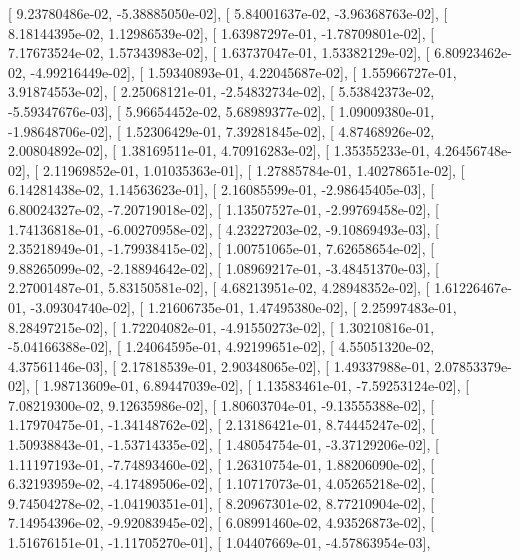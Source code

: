 \documentclass{article}
\begin{document}
       [  9.23780486e-02,  -5.38885050e-02],
       [  5.84001637e-02,  -3.96368763e-02],
       [  8.18144395e-02,   1.12986539e-02],
       [  1.63987297e-01,  -1.78709801e-02],
       [  7.17673524e-02,   1.57343983e-02],
       [  1.63737047e-01,   1.53382129e-02],
       [  6.80923462e-02,  -4.99216449e-02],
       [  1.59340893e-01,   4.22045687e-02],
       [  1.55966727e-01,   3.91874553e-02],
       [  2.25068121e-01,  -2.54832734e-02],
       [  5.53842373e-02,  -5.59347676e-03],
       [  5.96654452e-02,   5.68989377e-02],
       [  1.09009380e-01,  -1.98648706e-02],
       [  1.52306429e-01,   7.39281845e-02],
       [  4.87468926e-02,   2.00804892e-02],
       [  1.38169511e-01,   4.70916283e-02],
       [  1.35355233e-01,   4.26456748e-02],
       [  2.11969852e-01,   1.01035363e-01],
       [  1.27885784e-01,   1.40278651e-02],
       [  6.14281438e-02,   1.14563623e-01],
       [  2.16085599e-01,  -2.98645405e-03],
       [  6.80024327e-02,  -7.20719018e-02],
       [  1.13507527e-01,  -2.99769458e-02],
       [  1.74136818e-01,  -6.00270958e-02],
       [  4.23227203e-02,  -9.10869493e-03],
       [  2.35218949e-01,  -1.79938415e-02],
       [  1.00751065e-01,   7.62658654e-02],
       [  9.88265099e-02,  -2.18894642e-02],
       [  1.08969217e-01,  -3.48451370e-03],
       [  2.27001487e-01,   5.83150581e-02],
       [  4.68213951e-02,   4.28948352e-02],
       [  1.61226467e-01,  -3.09304740e-02],
       [  1.21606735e-01,   1.47495380e-02],
       [  2.25997483e-01,   8.28497215e-02],
       [  1.72204082e-01,  -4.91550273e-02],
       [  1.30210816e-01,  -5.04166388e-02],
       [  1.24064595e-01,   4.92199651e-02],
       [  4.55051320e-02,   4.37561146e-03],
       [  2.17818539e-01,   2.90348065e-02],
       [  1.49337988e-01,   2.07853379e-02],
       [  1.98713609e-01,   6.89447039e-02],
       [  1.13583461e-01,  -7.59253124e-02],
       [  7.08219300e-02,   9.12635986e-02],
       [  1.80603704e-01,  -9.13555388e-02],
       [  1.17970475e-01,  -1.34148762e-02],
       [  2.13186421e-01,   8.74445247e-02],
       [  1.50938843e-01,  -1.53714335e-02],
       [  1.48054754e-01,  -3.37129206e-02],
       [  1.11197193e-01,  -7.74893460e-02],
       [  1.26310754e-01,   1.88206090e-02],
       [  6.32193959e-02,  -4.17489506e-02],
       [  1.10717073e-01,   4.05265218e-02],
       [  9.74504278e-02,  -1.04190351e-01],
       [  8.20967301e-02,   8.77210904e-02],
       [  7.14954396e-02,  -9.92083945e-02],
       [  6.08991460e-02,   4.93526873e-02],
       [  1.51676151e-01,  -1.11705270e-01],
       [  1.04407669e-01,  -4.57863954e-03],
\end{document}
